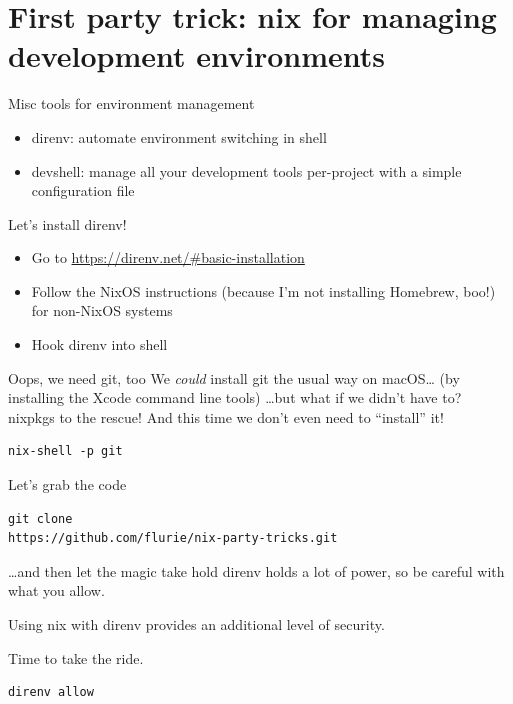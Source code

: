 \documentclass[bigger]{beamer}
\begin{document}
\section{First party trick: nix for managing development environments}
\label{sec:orgb6de55d}
\begin{frame}[label={sec:org9626570}]{Misc tools for environment management}
\begin{itemize}
\item direnv: automate environment switching in shell
\item devshell: manage all your development tools per-project with a simple configuration file
\end{itemize}
\end{frame}
\begin{frame}[label={sec:org0ccfe82}]{Let's install direnv!}
\begin{itemize}
\item Go to \url{https://direnv.net/\#basic-installation}
\item Follow the NixOS instructions (because I'm not installing Homebrew, boo!) for non-NixOS systems
\item Hook direnv into shell
\end{itemize}
\end{frame}
\begin{frame}[label={sec:orgf166639},fragile]{Oops, we need git, too}
 We \emph{could} install git the usual way on macOS\ldots{}
(by installing the Xcode command line tools)
\ldots{}but what if we didn't have to?
nixpkgs to the rescue! And this time we don't even need to ``install'' it!
\begin{verbatim}
nix-shell -p git
\end{verbatim}
\end{frame}
\begin{frame}[label={sec:orgeac0dfb},fragile]{Let's grab the code}
 \begin{verbatim}
git clone
https://github.com/flurie/nix-party-tricks.git
\end{verbatim}
\end{frame}
\begin{frame}[label={sec:org0b95c30},fragile]{\ldots{}and then let the magic take hold}
 direnv holds a \alert{lot} of power, so be careful with what you allow.

Using nix with direnv provides an additional level of security.

Time to take the ride.

\begin{verbatim}
direnv allow
\end{verbatim}
\end{frame}
\end{document}
